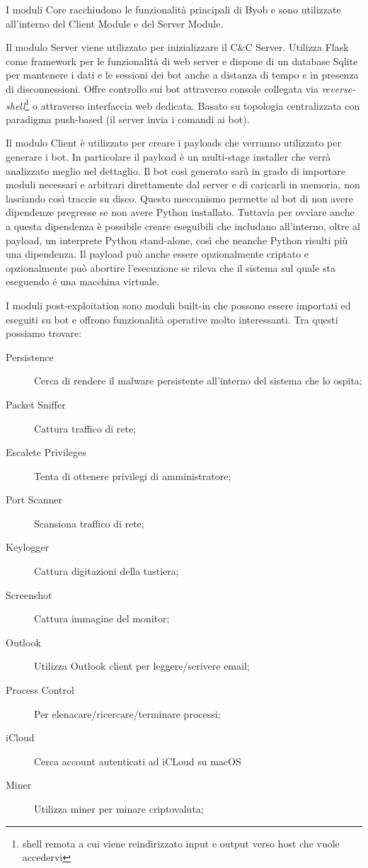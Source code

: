 I moduli Core racchiudono le funzionalità principali di Byob e sono utilizzate all'interno del Client Module e del Server Module.  

Il modulo Server viene utilizzato per inizializzare il C\&C Server. Utilizza Flask \cite{flask} come framework per le funzionalità di web server e  dispone di un database Sqlite \cite{sqlite} per mantenere i dati e le sessioni dei bot anche a distanza di tempo e in presenza di disconnessioni. Offre controllo sui bot attraverso console collegata via \textit{reverse-shell}\footnote{shell remota a cui viene reindirizzato input e output verso host che vuole accedervi} o attraverso interfaccia web dedicata. Basato su topologia centralizzata con paradigma push-based (il server invia i comandi ai bot).

Il modulo Client è utilizzato per creare i payloads che verranno utilizzato per generare i bot. In particolare il payload è un multi-stage installer che verrà analizzato meglio nel dettaglio.  Il bot così generato sarà in grado di importare moduli necessari e arbitrari direttamente dal server e di caricarli in memoria, non lasciando così traccie su disco. Questo meccanismo permette al bot di non avere dipendenze pregresse se non avere Python installato. Tuttavia per ovviare anche a questa dipendenza è possibile creare eseguibili che includano all'interno, oltre al payload, un interprete Python stand-alone, così che neanche Python risulti più una dipendenza.  Il payload può anche essere opzionalmente criptato e opzionalmente può abortire l'esecuzione se rileva che il sistema sul quale sta eseguendo é una macchina virtuale.

I moduli post-exploitation sono moduli built-in che possono essere importati ed eseguiti su bot e offrono funzionalità operative molto interessanti.
Tra questi possiamo trovare:

\begin{description}
    \item [Persistence] Cerca di rendere il malware persistente all'interno del sistema che lo ospita;
    \item [Packet Sniffer] Cattura traffico di rete;
    \item [Escalete Privileges] Tenta di ottenere privilegi di amministratore;
    \item [Port Scanner] Scansiona traffico di rete;
    \item [Keylogger] Cattura digitazioni della tastiera;
    \item [Screenshot] Cattura immagine del monitor;
    \item [Outlook] Utilizza Outlook client per leggere/scrivere email;
    \item [Process Control] Per elenacare/ricercare/terminare processi;
    \item [iCloud] Cerca account autenticati ad iCLoud su macOS
    \item [Miner] Utilizza miner per minare criptovaluta;
\end{description}

